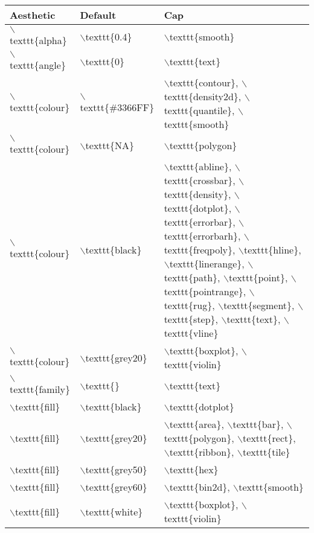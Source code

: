 \begin{table}[ht]
\centering
\begin{tabular}{lll}
  \hline
Aesthetic & Default & Cap \\ 
  \hline
$\backslash$texttt\{alpha\} & $\backslash$texttt\{0.4\} & $\backslash$texttt\{smooth\} \\ 
  $\backslash$texttt\{angle\} & $\backslash$texttt\{0\} & $\backslash$texttt\{text\} \\ 
  $\backslash$texttt\{colour\} & $\backslash$texttt\{\#3366FF\} & $\backslash$texttt\{contour\}, $\backslash$texttt\{density2d\}, $\backslash$texttt\{quantile\}, $\backslash$texttt\{smooth\} \\ 
  $\backslash$texttt\{colour\} & $\backslash$texttt\{NA\} & $\backslash$texttt\{polygon\} \\ 
  $\backslash$texttt\{colour\} & $\backslash$texttt\{black\} & $\backslash$texttt\{abline\}, $\backslash$texttt\{crossbar\}, $\backslash$texttt\{density\}, $\backslash$texttt\{dotplot\}, $\backslash$texttt\{errorbar\}, $\backslash$texttt\{errorbarh\}, $\backslash$texttt\{freqpoly\}, $\backslash$texttt\{hline\}, $\backslash$texttt\{linerange\}, $\backslash$texttt\{path\}, $\backslash$texttt\{point\}, $\backslash$texttt\{pointrange\}, $\backslash$texttt\{rug\}, $\backslash$texttt\{segment\}, $\backslash$texttt\{step\}, $\backslash$texttt\{text\}, $\backslash$texttt\{vline\} \\ 
  $\backslash$texttt\{colour\} & $\backslash$texttt\{grey20\} & $\backslash$texttt\{boxplot\}, $\backslash$texttt\{violin\} \\ 
  $\backslash$texttt\{family\} & $\backslash$texttt\{\} & $\backslash$texttt\{text\} \\ 
  $\backslash$texttt\{fill\} & $\backslash$texttt\{black\} & $\backslash$texttt\{dotplot\} \\ 
  $\backslash$texttt\{fill\} & $\backslash$texttt\{grey20\} & $\backslash$texttt\{area\}, $\backslash$texttt\{bar\}, $\backslash$texttt\{polygon\}, $\backslash$texttt\{rect\}, $\backslash$texttt\{ribbon\}, $\backslash$texttt\{tile\} \\ 
  $\backslash$texttt\{fill\} & $\backslash$texttt\{grey50\} & $\backslash$texttt\{hex\} \\ 
  $\backslash$texttt\{fill\} & $\backslash$texttt\{grey60\} & $\backslash$texttt\{bin2d\}, $\backslash$texttt\{smooth\} \\ 
  $\backslash$texttt\{fill\} & $\backslash$texttt\{white\} & $\backslash$texttt\{boxplot\}, $\backslash$texttt\{violin\} \\ 

\end{tabular}
\end{table}
